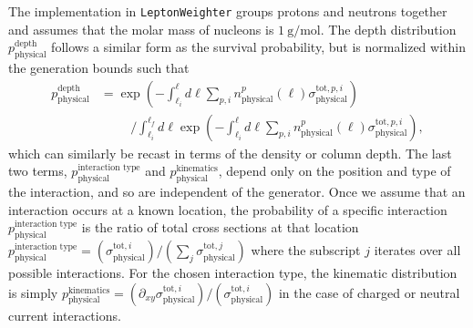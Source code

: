 \documentclass[main.tex]{subfiles}
\newcommand{\LeptonWeighter}{\texttt{LeptonWeighter}}
\begin{document}
The implementation in \LeptonWeighter{} groups protons and neutrons together and assumes that the molar mass of nucleons is $\SI{1}{\gram\per\mol}$.
The depth distribution $p_\textrm{physical}^\textrm{depth}$ follows a similar form as the survival probability, but is normalized within the generation bounds such that
\begin{equation}\begin{split}
p_\textrm{physical}^\textrm{depth} &= \exp\left(-{\int_{\ell_i}^{\ell}{d\ell \sum_{p,i} n_\textrm{physical}^p(\ell) \sigma_\textrm{physical}^{\textrm{tot},p,i} }}\right) \\
& \hspace{1cm} / \int_{\ell_i}^{\ell_f}{d\ell}\exp\left(-{\int_{\ell_i}^{\ell}{d\ell \sum_{p,i} n_\textrm{physical}^p(\ell) \sigma_\textrm{physical}^{\textrm{tot},p,i} }}\right),
\end{split}\end{equation}
which can similarly be recast in terms of the density or column depth.
The last two terms, $p_\textrm{physical}^\textrm{interaction type}$ and $p_\textrm{physical}^\textrm{kinematics}$, depend only on the position and type of the interaction, and so are independent of the generator.
Once we assume that an interaction occurs at a known location, the probability of a specific interaction $p_\textrm{physical}^\textrm{interaction type}$ is the ratio of total cross sections at that location $p_\textrm{physical}^\textrm{interaction type} = (\sigma_\textrm{physical}^{\textrm{tot}, i})/(\sum_j \sigma_\textrm{physical}^{\textrm{tot}, j})$ where the subscript $j$ iterates over all possible interactions.
For the chosen interaction type, the kinematic distribution is simply $p_\textrm{physical}^\textrm{kinematics} = (\partial_{xy}\sigma_\textrm{physical}^{\textrm{tot}, i}) / (\sigma_\textrm{physical}^{\textrm{tot}, i})$ in the case of charged or neutral current interactions.
\end{document}
